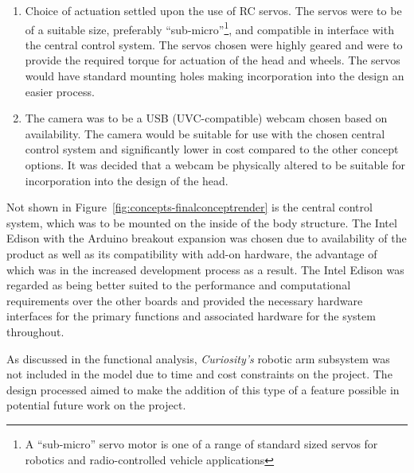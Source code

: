 \begin{enumerate}[label=\Alph*.]
      \item Choice of actuation settled upon the use of RC servos. The servos were to be of a suitable size, preferably ``sub-micro''\footnote{A ``sub-micro'' servo motor is one of a range of standard sized servos for robotics and radio-controlled vehicle applications}, and compatible in interface with the central control system. The servos chosen were highly geared and were to provide the required torque for actuation of the head and wheels. The servos would have standard mounting holes making incorporation into the design an easier process.
      \item The camera was to be a USB (UVC-compatible) webcam chosen based on availability. The camera would be suitable for use with the chosen central control system and significantly lower in cost compared to the other concept options. It was decided that a webcam be physically altered to be suitable for incorporation into the design of the head.
    \end{enumerate}
    
    Not shown in Figure~\ref{fig:concepts-finalconceptrender} is the central control system, which was to be mounted on the inside of the body structure. The Intel Edison with the Arduino breakout expansion was chosen due to availability of the product as well as its compatibility with add-on hardware, the advantage of which was in the increased development process as a result. The Intel Edison was regarded as being better suited to the performance and computational requirements over the other boards and provided the necessary hardware interfaces for the primary functions and associated hardware for the system throughout.
    
    As discussed in the functional analysis, \textit{Curiosity's} robotic arm subsystem was not included in the model due to time and cost constraints on the project. The design processed aimed to make the addition of this type of a feature possible in potential future work on the project.

    